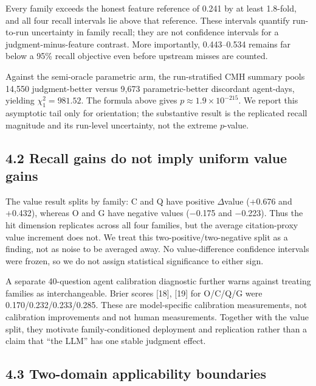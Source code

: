 \documentclass[
  conference,10pt]{IEEEtran}
\begin{document}
Every family exceeds the honest feature reference of 0.241 by at least 1.8-fold, and all four recall intervals lie above that reference. These intervals quantify run-to-run uncertainty in family recall; they are not confidence intervals for a judgment-minus-feature contrast. More importantly, 0.443--0.534 remains far below a 95\% recall objective even before upstream misses are counted.

Against the semi-oracle parametric arm, the run-stratified CMH summary pools 14,550 judgment-better versus 9,673 parametric-better discordant agent-days, yielding \(\chi^2_1=981.52\). The formula above gives \(p\approx1.9\times10^{-215}\). We report this asymptotic tail only for orientation; the substantive result is the replicated recall magnitude and its run-level uncertainty, not the extreme \(p\)-value.

\subsection{4.2 Recall gains do not imply uniform value gains}\label{recall-gains-do-not-imply-uniform-value-gains}

The value result splits by family: C and Q have positive \(\Delta\)value (+0.676 and +0.432), whereas O and G have negative values (−0.175 and −0.223). Thus the hit dimension replicates across all four families, but the average citation-proxy value increment does not. We treat this two-positive/two-negative split as a finding, not as noise to be averaged away. No value-difference confidence intervals were frozen, so we do not assign statistical significance to either sign.

A separate 40-question agent calibration diagnostic further warns against treating families as interchangeable. Brier scores {[}18{]}, {[}19{]} for O/C/Q/G were 0.170/0.232/0.233/0.285. These are model-specific calibration measurements, not calibration improvements and not human measurements. Together with the value split, they motivate family-conditioned deployment and replication rather than a claim that ``the LLM'' has one stable judgment effect.

\subsection{4.3 Two-domain applicability boundaries}\label{two-domain-applicability-boundaries}
\end{document}
